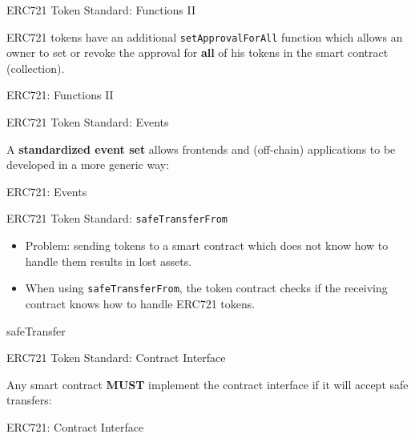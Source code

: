 \documentclass[handout]{beamer}
\begin{document}
\begin{frame}{ERC721 Token Standard: Functions II}

ERC721 tokens have an additional \texttt{setApprovalForAll} function which allows an owner to set or revoke the approval for \textbf{all} of his tokens in the smart contract (collection). 
\vspace{1em}
	\begin{samplecode}{ERC721: Functions II}
		
	\end{samplecode}
\end{frame}

\begin{frame}{ERC721 Token Standard: Events}

\vspace{0.5em}
	A \textbf{standardized event set} allows frontends and (off-chain) applications to be developed in a more generic way:
\vspace{1em}
	\begin{samplecode}{ERC721: Events}
		
	\end{samplecode}
\end{frame}

\begin{frame}{ERC721 Token Standard: \texttt{safeTransferFrom}}

\begin{itemize}
	\item Problem: sending tokens to a smart contract which does not know how to handle them results in lost assets.
	\item When using \texttt{safeTransferFrom}, the token contract checks if the receiving contract knows how to handle ERC721 tokens. 
\end{itemize}
\vspace{1em}
	\begin{samplecode}{safeTransfer}
		
	\end{samplecode}
\end{frame}


\begin{frame}{ERC721 Token Standard: Contract Interface}

\vspace{0.5em}
	Any smart contract \textbf{MUST} implement the contract interface if it will accept safe transfers:
\vspace{1em}
	\begin{samplecode}{ERC721: Contract Interface}
		
	\end{samplecode}
\end{frame}
\end{document}
